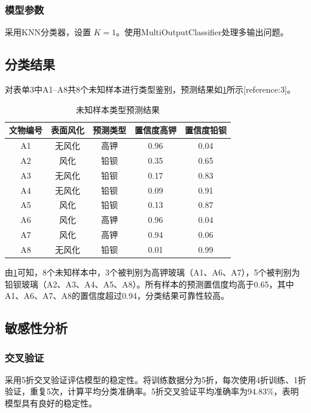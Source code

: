 \documentclass{cumcmthesis}
\begin{document}
\subsubsection{模型参数}
采用KNN分类器，设置 $K=1$。使用MultiOutputClassifier处理多输出问题。

\subsection{分类结果}

对表单3中A1--A8共8个未知样本进行类型鉴别，预测结果如\cref{tab:unknown_pred}所示[reference:3]。

\begin{table}[!htbp]
    \centering
    \caption{未知样本类型预测结果}
    \label{tab:unknown_pred}
    \begin{tabular}{c|c|c|c|c}
        \toprule[1.5pt]
        文物编号 & 表面风化 & 预测类型 & 置信度高钾 & 置信度铅钡 \\
        \midrule[1pt]
        A1 & 无风化 & 高钾 & 0.96 & 0.04 \\
        A2 & 风化 & 铅钡 & 0.35 & 0.65 \\
        A3 & 无风化 & 铅钡 & 0.17 & 0.83 \\
        A4 & 无风化 & 铅钡 & 0.09 & 0.91 \\
        A5 & 风化 & 铅钡 & 0.13 & 0.87 \\
        A6 & 风化 & 高钾 & 0.96 & 0.04 \\
        A7 & 风化 & 高钾 & 0.94 & 0.06 \\
        A8 & 无风化 & 铅钡 & 0.01 & 0.99 \\
        \bottomrule[1.5pt]
    \end{tabular}
\end{table}

由\cref{tab:unknown_pred}可知，8个未知样本中，3个被判别为高钾玻璃（A1、A6、A7），5个被判别为铅钡玻璃（A2、A3、A4、A5、A8）。所有样本的预测置信度均高于0.65，其中A1、A6、A7、A8的置信度超过0.94，分类结果可靠性较高。

\subsection{敏感性分析}

\subsubsection{交叉验证}
采用5折交叉验证评估模型的稳定性。将训练数据分为5折，每次使用4折训练、1折验证，重复5次，计算平均分类准确率。5折交叉验证平均准确率为94.83\%，表明模型具有良好的稳定性。
\end{document}
